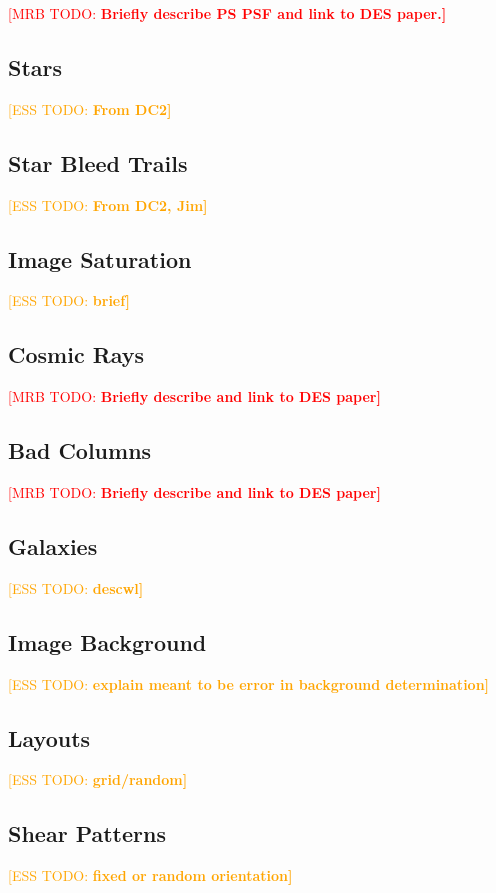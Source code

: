 \documentclass[iop, twocolappendix, appendixfloats, numberedappendix, apj]{hackemulateapj}
\newcommand{\mattodo}[1]{\textcolor{red}{[MRB TODO: \bf #1]}}
\newcommand{\esstodo}[1]{\textcolor{orange}{[ESS TODO: \bf #1]}}
\begin{document}
\mattodo{Briefly describe PS PSF and link to DES paper.}

\subsection{Stars} \label{sec:simfeatures:stars}
\esstodo{From DC2}
\subsection{Star Bleed Trails} \label{sec:simfeatures:bleeds}
\esstodo{From DC2, Jim}
\subsection{Image Saturation} \label{sec:simfeatures:sat}
\esstodo{brief}

\subsection{Cosmic Rays} \label{sec:simfeatures:cosmics}

\mattodo{Briefly describe and link to DES paper}

\subsection{Bad Columns} \label{sec:simfeatures:badcols}

\mattodo{Briefly describe and link to DES paper}

\subsection{Galaxies} \label{sec:simfeatures:galaxies}
\esstodo{descwl}
\subsection{Image Background} \label{sec:simfeatures:background}
\esstodo{explain meant to be error in background determination}

\subsection{Layouts} \label{sec:simfeatures:layouts}
\esstodo{grid/random}

\subsection{Shear Patterns} \label{sec:simfeatures:shears}
\esstodo{fixed or random orientation}
\end{document}
